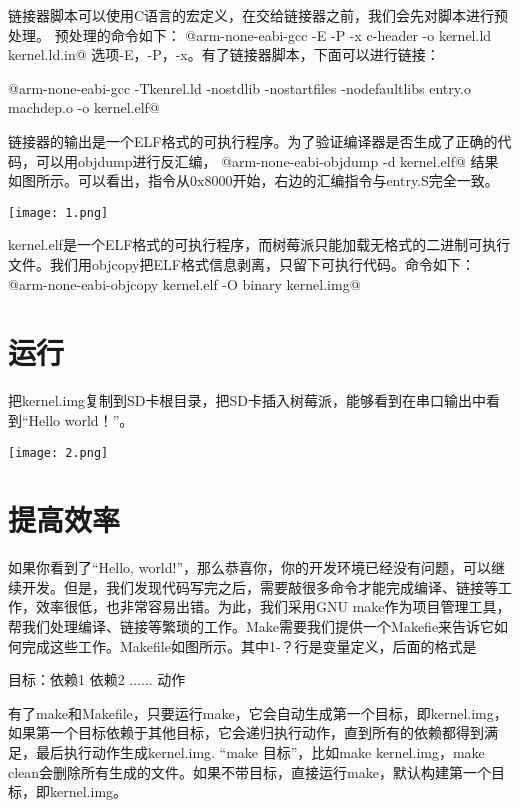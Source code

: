 \documentclass[main.tex]{subfiles}
\begin{document}
\begin{CJK*}{UTF8}{song}
\inputminted[linenos,numbersep=5pt,frame=lines,framesep=2mm]{c}{chapter02/kernel/kernel.ld.in}

链接器脚本可以使用C语言的宏定义，在交给链接器之前，我们会先对脚本进行预处理。
预处理的命令如下：
@arm-none-eabi-gcc -E -P -x c-header -o kernel.ld kernel.ld.in@
选项-E，-P，-x。有了链接器脚本，下面可以进行链接：

@arm-none-eabi-gcc -Tkenrel.ld -nostdlib -nostartfiles -nodefaultlibs entry.o machdep.o -o kernel.elf@

链接器的输出是一个ELF格式的可执行程序。为了验证编译器是否生成了正确的代码，可以用objdump进行反汇编，
@arm-none-eabi-objdump -d kernel.elf@
结果如图所示。可以看出，指令从0x8000开始，右边的汇编指令与entry.S完全一致。

\texttt{[image: 1.png]}

kernel.elf是一个ELF格式的可执行程序，而树莓派只能加载无格式的二进制可执行文件。我们用objcopy把ELF格式信息剥离，只留下可执行代码。命令如下：
@arm-none-eabi-objcopy kernel.elf -O binary kernel.img@

\section{运行}
把kernel.img复制到SD卡根目录，把SD卡插入树莓派，能够看到在串口输出中看到“Hello world！”。

\texttt{[image: 2.png]}

\section{提高效率}
如果你看到了“Hello, world!”，那么恭喜你，你的开发环境已经没有问题，可以继续开发。但是，我们发现代码写完之后，需要敲很多命令才能完成编译、链接等工作，效率很低，也非常容易出错。为此，我们采用GNU make作为项目管理工具，帮我们处理编译、链接等繁琐的工作。Make需要我们提供一个Makefie来告诉它如何完成这些工作。Makefile如图所示。其中1-？行是变量定义，后面的格式是

\par
目标：依赖1 依赖2 ......
	动作

\par
有了make和Makefile，只要运行make，它会自动生成第一个目标，即kernel.img，如果第一个目标依赖于其他目标，它会递归执行动作，直到所有的依赖都得到满足，最后执行动作生成kernel.img.  “make 目标”，比如make kernel.img，make clean会删除所有生成的文件。如果不带目标，直接运行make，默认构建第一个目标，即kernel.img。


\end{CJK*}
\end{document}
